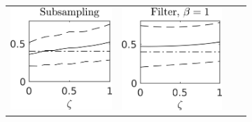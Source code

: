 \documentclass[10pt]{article}
\begin{document}
\begin{figure}[t]
	\vspace{0.5cm}
	\begin{subfigure}{\linewidth}
		\centering
		\begin{tabular}{cccc}
			\includegraphics[]{Figures/A2_sub_s7.png} & \includegraphics[]{Figures/A2_filt_s7_b1.png} &

\end{tabular}
\end{subfigure}
\end{figure}
\end{document}

